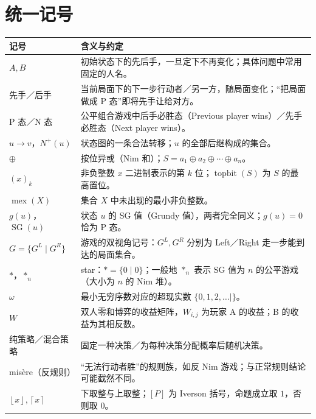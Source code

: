 \documentclass[UTF8,a4paper,11pt,oneside,openany,fontset=fandol]{ctexbook}
\theoremstyle{definition}
\newcommand{\mex}{\operatorname{mex}}
\newcommand{\SG}{\operatorname{SG}}
\newcommand{\Np}{N^+}
\newcommand{\topbit}{\operatorname{topbit}}
\newcommand{\floor}[1]{\left\lfloor #1\right\rfloor}
\newcommand{\ceil}[1]{\left\lceil #1\right\rceil}
\newcommand{\iva}[1]{\left[#1\right]}
\begin{document}
\section*{统一记号}
\begin{longtable}{p{}p{}}
\toprule
记号 & 含义与约定\\\midrule
$A,B$ & 初始状态下的先后手，一旦定下不再变化；具体问题中常用固定的人名。\\
先手／后手 & 当前局面下的下一步行动者／另一方，随局面变化；“把局面做成 P 态”即将先手让给对方。\\
P 态／N 态 & 公平组合游戏中后手必胜态（Previous player wins）／先手必胜态（Next player wins）。\\
$u\to v$，$\Np(u)$ & 状态图的一条合法转移；$u$ 的全部后继构成的集合。\\
$\oplus$ & 按位异或（Nim 和）；$S=a_1\oplus a_2\oplus\cdots\oplus a_n$。\\
$(x)_k$ & 非负整数 $x$ 二进制表示的第 $k$ 位；$\topbit(S)$ 为 $S$ 的最高置位。\\
$\mex(X)$ & 集合 $X$ 中未出现的最小非负整数。\\
$g(u)$，$\SG(u)$ & 状态 $u$ 的 SG 值（Grundy 值），两者完全同义；$g(u)=0$ 恰为 P 态。\\
$G=\{G^L\mid G^R\}$ & 游戏的双视角记号：$G^L,G^R$ 分别为 Left／Right 走一步能到达的局面集合。\\
$\ast$，$\ast_n$ & star：$\ast=\{0\mid 0\}$；一般地 $\ast_n$ 表示 SG 值为 $n$ 的公平游戏（大小为 $n$ 的 Nim 堆）。\\
$\omega$ & 最小无穷序数对应的超现实数 $\{0,1,2,\ldots\mid\}$。\\
$W$ & 双人零和博弈的收益矩阵，$W_{i,j}$ 为玩家 A 的收益；B 的收益为其相反数。\\
纯策略／混合策略 & 固定一种决策／为每种决策分配概率后随机决策。\\
misère（反规则） & “无法行动者胜”的规则族，如反 Nim 游戏；与正常规则结论可能截然不同。\\
$\floor{x},\ceil{x}$ & 下取整与上取整；$\iva{P}$ 为 Iverson 括号，命题成立取 $1$，否则取 $0$。\\
\bottomrule
\end{longtable}
\end{document}

